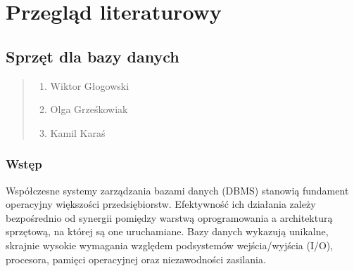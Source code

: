 \documentclass[letterpaper,10pt,polish]{sphinxmanual}
\begin{document}
\sphinxstepscope


\chapter{Przegląd literaturowy}
\label{\detokenize{rozdzia_u0142_2/index:przeglad-literaturowy}}\label{\detokenize{rozdzia_u0142_2/index::doc}}
\sphinxstepscope


\section{Sprzęt dla bazy danych}
\label{\detokenize{rozdzia_u0142_2/rozdzia_u0142_21/index:sprzet-dla-bazy-danych}}\label{\detokenize{rozdzia_u0142_2/rozdzia_u0142_21/index::doc}}\begin{quote}\begin{description}
\begin{enumerate}
%
\item {} 
\sphinxAtStartPar
Wiktor Głogowski

\item {} 
\sphinxAtStartPar
Olga Grześkowiak

\item {} 
\sphinxAtStartPar
Kamil Karaś

\end{enumerate}

\end{description}\end{quote}


\subsection{Wstęp}
\label{\detokenize{rozdzia_u0142_2/rozdzia_u0142_21/index:wstep}}
\sphinxAtStartPar
Współczesne systemy zarządzania bazami danych (DBMS) stanowią fundament operacyjny większości przedsiębiorstw. Efektywność ich działania zależy bezpośrednio od synergii pomiędzy warstwą oprogramowania a architekturą sprzętową, na której są one uruchamiane. Bazy danych wykazują unikalne, skrajnie wysokie wymagania względem podsystemów wejścia/wyjścia (I/O), procesora, pamięci operacyjnej oraz niezawodności zasilania.
\end{document}
